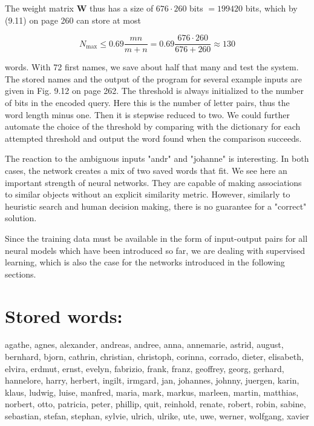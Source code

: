 \documentclass[10pt]{article}
\begin{document}
The weight matrix $\boldsymbol{W}$ thus has a size of $676 \cdot 260$ bits $=199420$ bits, which by (9.11) on page 260 can store at most

$$
N_{\max } \leq 0.69 \frac{m n}{m+n}=0.69 \frac{676 \cdot 260}{676+260} \approx 130
$$

words. With 72 first names, we save about half that many and test the system. The stored names and the output of the program for several example inputs are given in Fig. 9.12 on page 262. The threshold is always initialized to the number of bits in the encoded query. Here this is the number of letter pairs, thus the word length minus one. Then it is stepwise reduced to two. We could further automate the choice of the threshold by comparing with the dictionary for each attempted threshold and output the word found when the comparison succeeds.

The reaction to the ambiguous inputs "andr" and "johanne" is interesting. In both cases, the network creates a mix of two saved words that fit. We see here an important strength of neural networks. They are capable of making associations to similar objects without an explicit similarity metric. However, similarly to heuristic search and human decision making, there is no guarantee for a "correct" solution.

Since the training data must be available in the form of input-output pairs for all neural models which have been introduced so far, we are dealing with supervised learning, which is also the case for the networks introduced in the following sections.

\section*{Stored words:}
agathe, agnes, alexander, andreas, andree, anna, annemarie, astrid, august, bernhard, bjorn, cathrin, christian, christoph, corinna, corrado, dieter, elisabeth, elvira, erdmut, ernst, evelyn, fabrizio, frank, franz, geoffrey, georg, gerhard, hannelore, harry, herbert, ingilt, irmgard, jan, johannes, johnny, juergen, karin, klaus, ludwig, luise, manfred, maria, mark, markus, marleen, martin, matthias, norbert, otto, patricia, peter, phillip, quit, reinhold, renate, robert, robin, sabine, sebastian, stefan, stephan, sylvie, ulrich, ulrike, ute, uwe, werner, wolfgang, xavier


\end{document}
